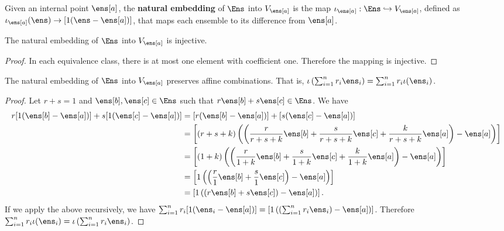 \begin{mathSection}
	\begin{defn}
		Given an internal point $\ens[a]$, the \textbf{natural embedding} of $\Ens$ into $V_{\ens[a]}$ is the map $\iota_{\ens[a]} : \Ens \hookrightarrow V_{\ens[a]}$, defined as $\iota_{\ens[a]}(\ens) \to [1(\ens - \ens[a])]$, that maps each ensemble to its difference from $\ens[a]$.
	\end{defn}
	
	\begin{coro}
		The natural embedding of $\Ens$ into $V_{\ens[a]}$  is injective.
	\end{coro}
	
	\begin{proof}
		In each equivalence class, there is at most one element with coefficient one. Therefore the mapping is injective.
	\end{proof}
	
	\begin{coro}
		The natural embedding of $\Ens$ into $V_{\ens[a]}$ preserves affine combinations. That is, $\iota\left(\sum_{i=1}^n r_i \ens_i \right) = \sum_{i=1}^n r_i \iota(\ens_i)$.
	\end{coro}
	
	\begin{proof}
		Let $r+s=1$ and $\ens[b], \ens[c] \in \Ens$ such that $r\ens[b] + s \ens[c] \in \Ens$. We have
		\begin{equation}
			\begin{aligned}
				r[1(\ens[b] - \ens[a])] +s[1(\ens[c] - \ens[a])] &= [r(\ens[b] - \ens[a])] +[s(\ens[c] - \ens[a])] \\
				&= \left[(r+s+k) \left(\left(\frac{r}{r+s+k}\ens[b] + \frac{s}{r+s+k} \ens[c] +\frac{k}{r+s+k} \ens[a] \right) - \ens[a]\right)\right] \\
				&= \left[(1+k) \left(\left(\frac{r}{1+k}\ens[b] + \frac{s}{1+k} \ens[c] +\frac{k}{1+k} \ens[a] \right) - \ens[a]\right)\right] \\
				&= \left[1 \left(\left(\frac{r}{1}\ens[b] + \frac{s}{1} \ens[c] \right) - \ens[a]\right)\right] \\
				&= \left[1\left(\left(r\ens[b] + s \ens[c] \right) - \ens[a]\right)\right].
			\end{aligned}
		\end{equation}
		If we apply the above recursively, we have $\sum_{i=1}^{n} r_i [1(\ens_i - \ens[a])] = \left[1\left(\left(\sum_{i=1}^{n}r_i \ens_i\right) - \ens[a]\right)\right]$. Therefore $\sum_{i=1}^n r_i \iota(\ens_i) = \iota\left(\sum_{i=1}^n r_i \ens_i \right)$.
	\end{proof}
	

\end{mathSection}
